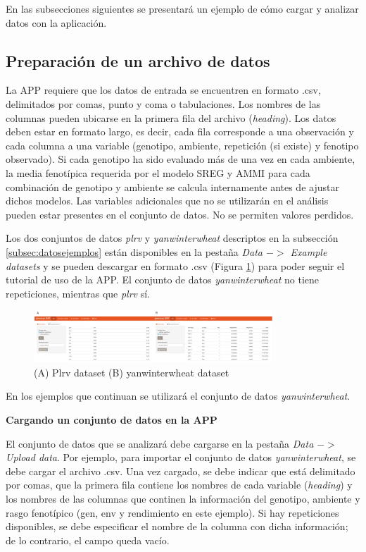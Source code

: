 En las subsecciones siguientes se presentará un ejemplo de cómo cargar y analizar datos con la aplicación.


\subsection{Preparación de un archivo de datos}

La APP requiere que los datos de entrada se encuentren en formato .csv, delimitados por comas, punto y coma o tabulaciones. Los nombres de las columnas pueden ubicarse en la primera fila del archivo (\emph{heading}). Los datos deben estar en formato largo, es decir, cada fila corresponde a una observación y cada columna a una variable (genotipo, ambiente, repetición (si existe) y fenotipo observado). Si cada genotipo ha sido evaluado más de una vez en cada ambiente, la media fenotípica requerida por el modelo SREG y AMMI para cada combinación de genotipo y ambiente se calcula internamente antes de ajustar dichos modelos. Las variables adicionales que no se utilizarán en el análisis pueden estar presentes en el conjunto de datos. No se permiten valores perdidos.

Los dos conjuntos de datos \emph{plrv} y \emph{yanwinterwheat} descriptos en la subsección \ref{subsec:datosejemplos} están disponibles en la pestaña \emph{Data $->$ Example datasets} y se pueden descargar en formato .csv (Figura \ref{fig:dataexample}) para poder seguir el tutorial de uso de la APP. El conjunto de datos \emph{yanwinterwheat} no tiene repeticiones, mientras que \emph{plrv} sí. 

 \begin{figure}[H]
	\begin{center}
		\includegraphics[width=0.8\textwidth]{./Graficos/www/exampledata.jpg}
	\end{center}
	\caption{(A) Plrv dataset (B) yanwinterwheat dataset }
	\label{fig:dataexample}
\end{figure}

En los ejemplos que continuan se utilizará el conjunto de datos \emph{yanwinterwheat}.

\textbf{Cargando un conjunto de datos en la APP}

El conjunto de datos que se analizará debe cargarse en la pestaña \emph{Data $->$ Upload data}. Por ejemplo, para importar el conjunto de datos \emph{yanwinterwheat}, se debe cargar el archivo .csv. Una vez cargado, se debe indicar que está delimitado por comas, que la primera fila contiene los nombres de cada variable (\emph{heading}) y los nombres de las columnas que continen la información del genotipo, ambiente y rasgo fenotípico (gen, env y rendimiento en este ejemplo). Si hay repeticiones disponibles, se debe especificar el nombre de la columna con dicha información; de lo contrario, el campo queda vacío. 

